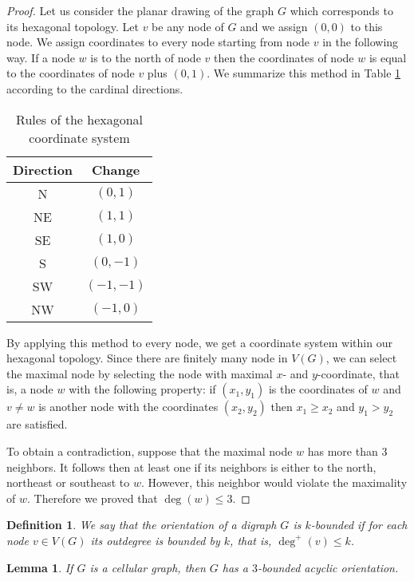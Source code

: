 \documentclass[letterpaper, 10 pt, conference]{ieeeconf}  %
\newtheorem{lem}{Lemma}
\newtheorem{defi}{Definition}
\begin{document}
\begin{proof} Let us consider the planar drawing of the graph $G$ which corresponds to its hexagonal topology.
Let $v$ be any node of $G$ and we assign $(0,0)$ to this node. We assign coordinates to every node starting from node $v$ in the following way. If a node $w$ is to the north of node $v$ then the coordinates of node $w$ is equal to the coordinates of node $v$ plus $(0,1)$. We summarize this method in Table \ref{table:assignment} according to the cardinal directions.
\begin{table}[!h]
\centering
 \begin{tabular}{||c|c||} 
 \hline
 Direction & Change  \\ [0.5ex] 
 \hline\hline
 N & $(0,1)$  \\ 
 \hline
 NE & $(1,1)$ \\
 \hline
 SE & $(1,0)$ \\
 \hline
 S & $(0,-1)$ \\
 \hline
 SW & $(-1,-1)$ \\
 \hline
 NW & $(-1,0)$ \\
 \hline
 \end{tabular}
  \caption{Rules of the hexagonal coordinate system}\label{table:assignment}
\end{table}
By applying this method to every node, we get a coordinate system within our hexagonal topology. Since there are finitely many node in $V(G)$, we can select the maximal node by selecting the node with maximal $x$- and $y$-coordinate, that is, a node $w$ with the following property: if $(x_1,y_1)$ is the coordinates of $w$ and $v \neq w$ is another node with the coordinates $(x_2,y_2)$ then $x_1 \geqslant x_2$ and $y_1 > y_2$ are satisfied.

To obtain a contradiction, suppose that the maximal node $w$ has more than 3 neighbors. It follows then at least one if its neighbors is either to the north, northeast or southeast to $w$. However, this neighbor would violate the maximality of $w$. Therefore we proved that $\deg(w) \leqslant 3$.
\end{proof}
\begin{defi}
We say that the orientation of a digraph $G$ is $k$\textit{-bounded} if for each node $v \in V(G)$ its outdegree is bounded by $k$, that is, $\deg^+(v) \leqslant k$.
\end{defi}
\begin{lem}\label{lem:bounded-acyclic-orientation}
If $G$ is a cellular graph, then $G$ has a $3$-bounded acyclic orientation.
\end{lem}
\end{document}

